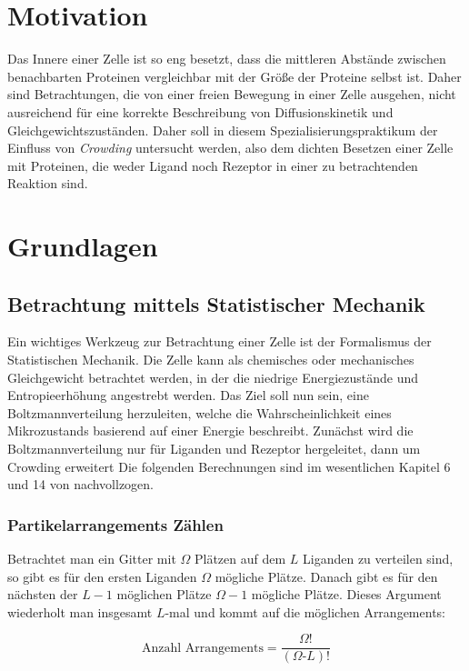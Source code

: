 \documentclass[bachelor,       %
               twoside,        %
               BCOR10mm,       %
               english,ngerman, %
               ]{GAUBM}
\begin{document}
\mainmatter   %

\chapter{Motivation}
Das Innere einer Zelle ist so eng besetzt, dass die mittleren Abstände zwischen
benachbarten Proteinen vergleichbar mit der Größe der Proteine selbst ist.
Daher sind Betrachtungen, die von einer freien Bewegung in einer Zelle ausgehen,
nicht ausreichend für eine korrekte Beschreibung von Diffusionskinetik und Gleichgewichtszuständen.
Daher soll in diesem Spezialisierungspraktikum der Einfluss von \emph{Crowding}
untersucht werden, also dem dichten Besetzen einer Zelle mit Proteinen, die weder
Ligand noch Rezeptor in einer zu betrachtenden Reaktion sind.


\chapter{Grundlagen}
\section{Betrachtung mittels Statistischer Mechanik}
Ein wichtiges Werkzeug zur Betrachtung einer Zelle ist der Formalismus der
Statistischen Mechanik. Die Zelle kann als chemisches oder mechanisches Gleichgewicht
betrachtet werden, in der die niedrige Energiezustände und Entropieerhöhung angestrebt
werden. Das Ziel soll nun sein, eine Boltzmannverteilung herzuleiten, welche die
Wahrscheinlichkeit eines Mikrozustands basierend auf einer Energie beschreibt.
Zunächst wird die Boltzmannverteilung nur für Liganden und Rezeptor hergeleitet,
dann um Crowding erweitert
Die folgenden Berechnungen sind im wesentlichen Kapitel 6 und 14 von
\cite{phybio} nachvollzogen.

\subsection{Partikelarrangements Zählen}

Betrachtet man ein Gitter mit $\Omega$ Plätzen auf dem $L$ Liganden zu verteilen
sind, so gibt es für den ersten Liganden $\Omega$ mögliche Plätze. Danach gibt es
für den nächsten der $L - 1$ möglichen Plätze $\Omega - 1$ mögliche Plätze.
Dieses Argument wiederholt man insgesamt $L$-mal und kommt auf die möglichen Arrangements:

\begin{equation}
\text{Anzahl Arrangements} = \frac{\Omega!}{(\Omega\text{-}L)!}
\end{equation}
\end{document}
